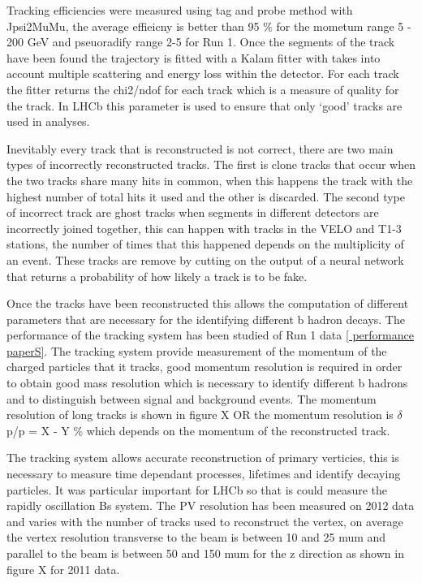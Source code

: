 Tracking efficiencies were measured using tag and probe method with Jpsi2MuMu, the average effieicny is better than 95 $\%$ for the mometum range 5 - 200 GeV and pseuoradify range 2-5 for Run 1. %
Once the segments of the track have been found the trajectory is fitted with a Kalam fitter with takes into account multiple scattering and energy loss within the detector. For each track the fitter returns the chi2/ndof for each track which is a measure of quality for the track. In LHCb this parameter is used to ensure that only ‘good’ tracks are used in analyses. 

Inevitably every track that is reconstructed is not correct, there are two main types of incorrectly reconstructed tracks. The first is clone tracks that occur when the two tracks share many hits in common, when this happens the track with the highest number of total hits it used and the other is discarded. The second type of incorrect track are ghost tracks when segments in different detectors are incorrectly joined together, this can happen with tracks in the VELO and T1-3 stations, the number of times that this happened depends on the multiplicity of an event. These tracks are remove by cutting on the output of a neural network that returns a probability of how likely a track is to be fake.



Once the tracks have been reconstructed this allows the computation of different parameters that are necessary for the identifying different b hadron decays. The performance of the tracking system has been studied of Run 1 data \ref{ performance paperS}. The tracking system provide measurement of the momentum of the charged particles that it tracks, good momentum resolution is required in order to obtain good mass resolution which is necessary to identify different  b hadrons and to distinguish between signal and background events. The momentum resolution of long tracks is shown in figure X OR the momentum resolution is $\delta$p/p = X - Y $\%$ which depends on the momentum of the reconstructed track. 


The tracking system allows accurate reconstruction of primary verticies, this is necessary to measure time dependant processes, lifetimes and identify decaying particles. It was particular important for LHCb so that is could measure the rapidly oscillation Bs system. The PV resolution has been measured on 2012 data and varies with the number of tracks used to reconstruct the vertex, on average the vertex resolution transverse to the beam is between 10 and 25 mum and parallel to the beam is  between 50 and 150 mum for the z direction as shown in figure X for 2011 data. %



